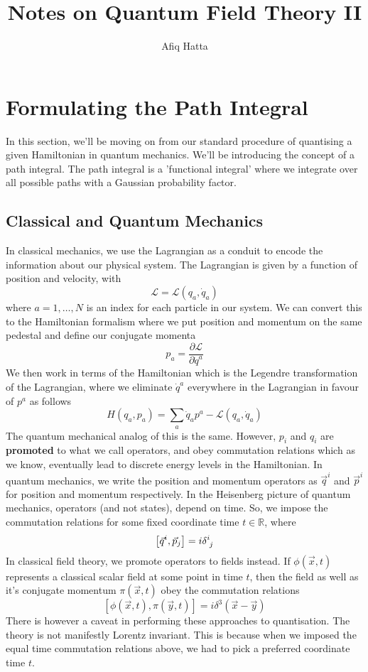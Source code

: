 \documentclass[11pt, oneside]{article}   	%
\title{Notes on Quantum Field Theory II}
\author{Afiq Hatta}
\theoremstyle{slanted}
\begin{document}
 
\maketitle
\tableofcontents

\pagebreak 

\section{Formulating the Path Integral} 

In this section, we'll be moving on from 
our standard procedure of quantising a given Hamiltonian 
in quantum mechanics. We'll be introducing 
the concept of a path integral. The path integral 
is a 'functional integral' where we integrate over 
all possible paths with a Gaussian probability factor.

\subsection{Classical and Quantum Mechanics}
In classical mechanics, we use the Lagrangian 
as a conduit to encode the information about our 
physical system. The Lagrangian is given by a function 
of position and velocity, with 
\[
	\mathcal{ L }  = \mathcal{ L } \left( q _ a , \dot {q} _ a  \right) 
\] where $ a = 1 , \dots  , N $ is an index for each particle 
in our system. We can convert this to the Hamiltonian formalism 
where we put position and momentum on the same pedestal and 
define our conjugate momenta
\[
 p _ a = \frac{\partial  \mathcal{ L }}{\partial  \dot{q } ^ a  } 
\] We then work in terms of the Hamiltonian 
which is the Legendre transformation of the 
Lagrangian, where we eliminate $ \dot{ q }^ a   $
everywhere in the Lagrangian in favour of $ p^ a$ as follows 
\[
	H ( q_a , p _ a  ) = \sum _{ a } \dot{ q }_ a p ^ a  - \mathcal{ L } \left( q _ a , \dot{ q } _ a  \right)   
\] 
The quantum mechanical analog of this is the same. 
However, $ p_ i $ and $ q _ i $ are \textbf{promoted} to 
what we call operators, and obey commutation relations 
which as we know, eventually lead to discrete energy levels 
in the Hamiltonian. In quantum mechanics,
we write the position and momentum operators 
as $ \vec{q}^ i  $ and $ \vec{p} ^ i $ for position  
and momentum respectively. 
In the Heisenberg picture of quantum mechanics, 
operators (and not states), depend on time. 
So, we impose the commutation relations 
for some fixed coordinate time $ t \in \mathbb{ R } $, where 
\[
 \left[  \vec{q}^ i , \vec{p} _ j  \right]   = i  \delta \indices{ ^ i _ j }  
\]  
In classical field theory, we 
promote operators 
to fields instead. If $ \phi ( \vec{x} , t ) $  
represents a classical scalar field at some point in time $ t $, 
then the field as well as it's conjugate momentum $ \pi \left( \vec{x}, t   \right) $ 
obey the commutation relations
\[
	\left[  \phi ( \vec{x},  t ) , \pi ( \vec{y}, t  )  \right]  
	= i \delta ^ 3 \left( \vec{x} - \vec{y} \right) 
\] There is however a caveat in performing these 
approaches to quantisation. 
The theory is not manifestly Lorentz invariant. This is because 
when we imposed the equal time commutation 
relations above, we had to pick a preferred coordinate 
time $ t $. 
\end{document}
